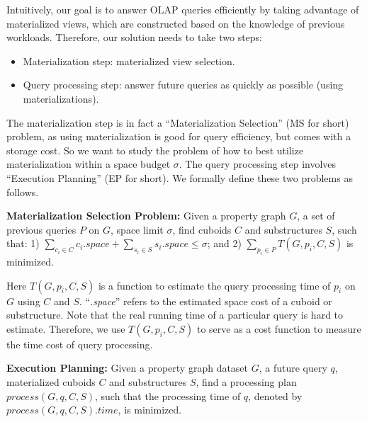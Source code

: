 Intuitively, our goal is to answer OLAP queries efficiently by taking advantage of materialized views, which are constructed based on the knowledge of previous workloads. Therefore, our solution needs to take two steps:

\begin{itemize}
	\item Materialization step: materialized view selection. 
	\item Query processing step: answer future queries as quickly as possible (using materializations). 
\end{itemize} 

The materialization step is in fact a ``Materialization Selection'' (MS for short) problem, as using materialization is good for query efficiency, but comes with a storage cost. So we want to study the problem of how to best utilize materialization within a space budget $\sigma$.   The query processing step involves ``Execution Planning'' (EP for short). We formally define these two problems as follows.

\noindent\textbf{Materialization Selection Problem:} Given a property graph $G$, a set of previous queries $P$ on $G$, space limit $\sigma$, find cuboids $C$ and substructures $S$, such that: 1) $\displaystyle{\sum_{c_{i}\in C}c_{i}.space} + 
\displaystyle{\sum_{s_{i}\in S}s_{i}.space} 
\leq \sigma
$; and 2) $\displaystyle{\sum_{p_{i}\in P}T(G, p_{i}, C, S)}$  is minimized. 

Here $T(G, p_{i}, C, S)$ is a function to estimate the  query processing time of $p_{i}$ on $G$ using  $C$ and $S$. ``\emph{.space}'' refers to the estimated space cost of a cuboid or substructure. Note that the real running time of a particular query is hard to estimate. Therefore, we use $T(G, p_{i}, C, S)$ to serve as a cost function to measure the time cost of query processing. 


\noindent\textbf{Execution Planning:} Given a property graph dataset $G$, a future query $q$, materialized cuboids $C$ and substructures $S$, find a processing plan $process(G, q, C, S)$, such that the processing time of $q$, denoted by $process(G, q, C, S).time$, is minimized. 

